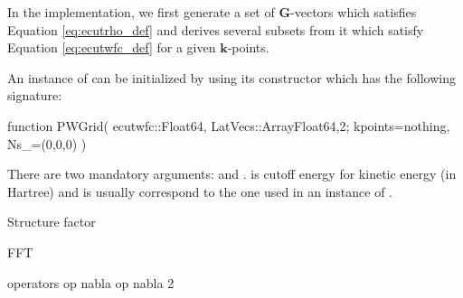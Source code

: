 In the implementation, we first generate a set of $\mathbf{G}$-vectors which satisfies
Equation \eqref{eq:ecutrho_def} and derives several subsets from it which
satisfy Equation \eqref{eq:ecutwfc_def} for a given $\mathbf{k}$-points.

An instance of  can be initialized by using its constructor
which has the following signature:
\begin{juliacode}
function PWGrid( ecutwfc::Float64, LatVecs::Array{Float64,2};
    kpoints=nothing, Ns_=(0,0,0) )
\end{juliacode}
There are two mandatory arguments:  and .
 is cutoff energy for kinetic energy (in Hartree) and
 is usually correspond to the one used in an
instance of .

Structure factor

FFT

operators op nabla op nabla 2


